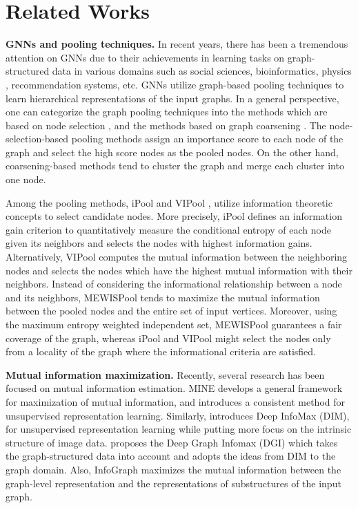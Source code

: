 \documentclass{article}
\begin{document}
\section{Related Works}
\label{sec:relwork}
\textbf{GNNs and pooling techniques.} In recent years, there has been a tremendous attention on GNNs due to their achievements in learning tasks on graph-structured data in various domains such as social sciences\cite{gcn}, bioinformatics\cite{messagepassing}, physics \cite{physics2}, recommendation systems\cite{recom2}, etc. GNNs utilize graph-based pooling techniques to learn hierarchical representations of the input graphs. 
In a general perspective, one can categorize the graph pooling techniques into the methods which are based on node selection \cite{gunet, sagpool, gxn, tagss}, and the methods based on graph coarsening \cite{diffpool, mincutpool, ecc, ipool, structpool}. The node-selection-based pooling methods assign an importance score to each node of the graph and select the high score nodes as the pooled nodes. On the other hand, coarsening-based methods tend to cluster the graph and merge each cluster into one node. 

Among the pooling methods, iPool \cite{ipool} and VIPool \cite{gxn}, utilize information theoretic concepts to select candidate nodes. More precisely, iPool defines an information gain criterion to quantitatively measure the conditional entropy of each node given its neighbors and selects the nodes with highest information gains. Alternatively, VIPool computes the mutual information between the neighboring nodes and selects the nodes which have the highest mutual information with their neighbors. Instead of considering the informational relationship between a node and its neighbors, MEWISPool tends to maximize the mutual information between the pooled nodes and the entire set of input vertices. Moreover, using the maximum entropy weighted independent set, MEWISPool guarantees a fair coverage of the graph, whereas iPool and VIPool might select the nodes only from a locality of the graph where the informational criteria are satisfied.

\textbf{Mutual information maximization.}
Recently, several research has been focused on mutual information estimation. MINE \cite{MINE} develops a general framework for maximization of mutual information, and introduces a consistent method for unsupervised representation learning. Similarly, \cite{DIM} introduces Deep InfoMax (DIM), for unsupervised representation learning while putting more focus on the intrinsic structure of image data. \cite{DGInfo} proposes the Deep Graph Infomax (DGI) which takes the graph-structured data into account and adopts the ideas from DIM to the graph domain. Also, InfoGraph \cite{infograph} maximizes the mutual information between the graph-level representation and the representations of substructures of the input graph.
\end{document}
